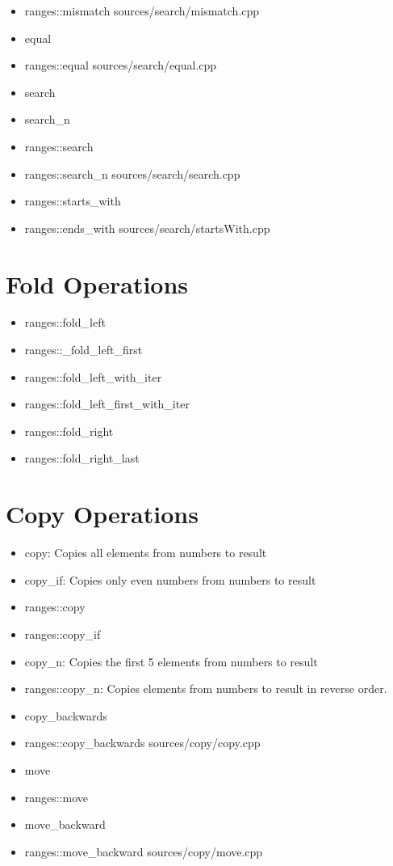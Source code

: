 \documentclass{article}
\begin{document}
\begin{itemize}
      \item ranges::mismatch
         {sources/search/mismatch.cpp}
      \item equal
      \item ranges::equal
         {sources/search/equal.cpp}
      \item search
      \item search\_n
      \item ranges::search
      \item ranges::search\_n
         {sources/search/search.cpp}
      \item ranges::starts\_with
      \item ranges::ends\_with
         {sources/search/startsWith.cpp}
    \end{itemize}
\section{Fold Operations}
    \begin{itemize}
      \item ranges::fold\_left
      \item ranges::\_fold\_left\_first
      \item ranges::fold\_left\_with\_iter
      \item ranges::fold\_left\_first\_with\_iter
      \item ranges::fold\_right
      \item ranges::fold\_right\_last
    \end{itemize}
\section{Copy Operations}
    \begin{itemize}
      \item copy: Copies all elements from numbers to result
      \item copy\_if: Copies only even numbers from numbers to result
      \item ranges::copy
      \item ranges::copy\_if
      \item copy\_n: Copies the first 5 elements from numbers to result
      \item ranges::copy\_n: Copies elements from numbers to result in reverse order.
      \item copy\_backwards
      \item ranges::copy\_backwards
         {sources/copy/copy.cpp}
      \item move
      \item ranges::move
      \item move\_backward
      \item ranges::move\_backward
         {sources/copy/move.cpp}
    \end{itemize}
\end{document}
